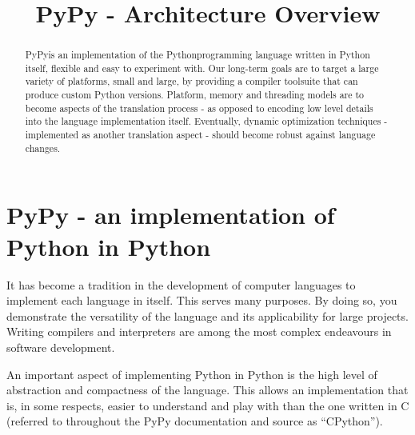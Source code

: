 \documentclass[a4paper,11pt,english]{article}
\title{PyPy - Architecture Overview}
\newlength{\locallinewidth}
\begin{document}
\maketitle


\setlength{\locallinewidth}{\linewidth}
\begin{abstract}
PyPy\footnotemark[1] is an implementation of the Python\footnotemark[2] programming language written in
Python itself, flexible and easy to experiment with.  Our long-term goals are
to target a large variety of platforms, small and large, by providing a
compiler toolsuite that can produce custom Python versions.  Platform, memory
and threading models are to become aspects of the translation process - as
opposed to encoding low level details into the language implementation itself.
Eventually, dynamic optimization techniques - implemented as another
translation aspect - should become robust against language changes.
\end{abstract}


\hypertarget{pypy-an-implementation-of-python-in-python}{}
\section{PyPy - an implementation of Python in Python}

It has become a tradition in the development of computer languages to
implement each language in itself.  This serves many purposes. By doing so,
you demonstrate the versatility of the language and its applicability for
large projects.  Writing compilers and interpreters are among the most
complex endeavours in software development.

An important aspect of implementing Python in Python is the high level of
abstraction and compactness of the language. This allows an implementation
that is, in some respects, easier to understand and play with than the one
written in C (referred to throughout the PyPy documentation and source as
``CPython''\footnotemark[3]).
\end{document}
